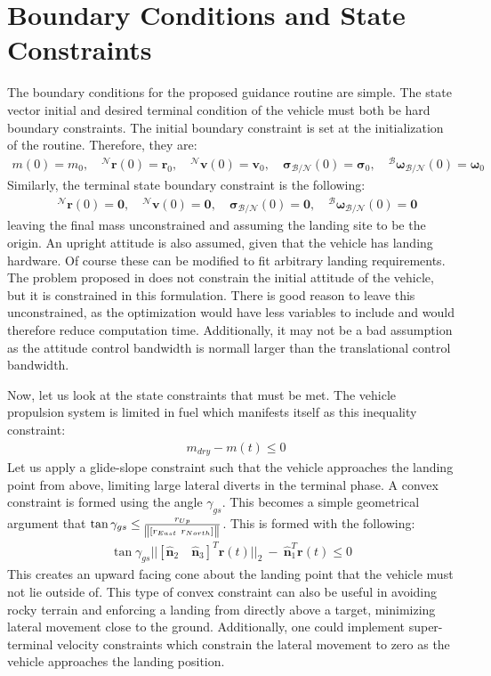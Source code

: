 \documentclass[conf]{new-aiaa}
\begin{document}
\section{Boundary Conditions and State Constraints}
The boundary conditions for the proposed guidance routine are simple. The state vector initial and desired terminal condition of the vehicle must both be hard boundary constraints. The initial boundary constraint is set at the initialization of the routine. Therefore, they are:
\begin{align}
	m(0) = m_0, \quad ^\mathcal{N}\mathbf{r}(0) = \mathbf{r}_0, \quad ^\mathcal{N}\mathbf{v}(0) = \mathbf{v}_0, \quad \boldsymbol{\sigma}_\mathcal{B/N}(0) = \boldsymbol{\sigma}_0, \quad  ^\mathcal{B}\boldsymbol{\omega}_\mathcal{B/N}(0) = \boldsymbol{\omega}_0
\end{align}
Similarly, the terminal state boundary constraint is the following:
\begin{align}
	\quad ^\mathcal{N}\mathbf{r}(0) = \mathbf{0}, \quad ^\mathcal{N}\mathbf{v}(0) = \mathbf{0}, \quad \boldsymbol{\sigma}_\mathcal{B/N}(0) = \mathbf{0}, \quad  ^\mathcal{B}\boldsymbol{\omega}_\mathcal{B/N}(0) = \mathbf{0}
\end{align}
leaving the final mass unconstrained and assuming the landing site to be the origin. An upright attitude is also assumed, given that the vehicle has landing hardware. Of course these can be modified to fit arbitrary landing requirements. The problem proposed in \cite{szmuk2018successive} does not constrain the initial attitude of the vehicle, but it is constrained in this formulation. There is good reason to leave this unconstrained, as the optimization would have less variables to include and would therefore reduce computation time. Additionally, it may not be a bad assumption as the attitude control bandwidth is normall larger than the translational control bandwidth.

Now, let us look at the state constraints that must be met. The vehicle propulsion system is limited in fuel which manifests itself as this inequality constraint:
\begin{align}
& m_{dry} - m(t) \leq 0
\end{align}
%
Let us apply a glide-slope constraint such that the vehicle approaches the landing point from above, limiting large lateral diverts in the terminal phase. A convex constraint  is formed using the angle $\gamma_{gs}$. This becomes a simple geometrical argument that $\tan{\gamma_{gs}} \leq \frac{r_{Up}}{\norm{[ r_{East} \ r_{North}]}}$. This is formed with the following:
\begin{align}
\tan{\gamma_{gs}} || [\hat{\bm{n}}_2 \quad \hat{\bm{n}}_3 ]^T \mathbf{r}(t) \lvert\lvert_2 \ - \ \hat{\bm{n}}_1^T \mathbf{r}(t) \leq 0
\end{align}
This  creates an upward facing cone about the landing point that the vehicle must not lie outside of. This type of convex constraint can also be useful in avoiding rocky terrain and enforcing a landing from directly above a target, minimizing lateral movement close to the ground. Additionally, one could implement super-terminal velocity constraints which constrain the lateral movement to zero as the vehicle approaches the landing position.
\end{document}
